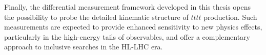 Finally, the differential measurement framework developed in this thesis opens the possibility to probe the detailed kinematic structure of $t\bar{t}t\bar{t}$ production. 
Such measurements are expected to provide enhanced sensitivity to new physics effects, particularly in the high-energy tails of observables, and offer a complementary approach to inclusive searches in the HL-LHC era.